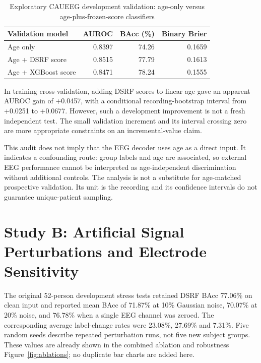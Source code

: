 \begin{table}[!htbp]\centering\small
\caption{Exploratory CAUEEG development validation: age-only versus age-plus-frozen-score classifiers}\label{tab:age-validation}
\begin{tabular}{@{}lrrr@{}}\toprule
\textbf{Validation model}&\textbf{AUROC}&\textbf{BAcc (\%)}&\textbf{Binary Brier}\\\midrule
Age only&0.8397&74.26&0.1659\\
Age + DSRF score&0.8515&77.79&0.1613\\
Age + XGBoost score&0.8471&78.24&0.1555\\\bottomrule
\end{tabular}\end{table}

In training cross-validation, adding DSRF scores to linear age gave an apparent AUROC gain of +0.0457, with a conditional recording-bootstrap interval from +0.0251 to +0.0677. However, such a development improvement is not a fresh independent test. The small validation increment and its interval crossing zero are more appropriate constraints on an incremental-value claim.


This audit does not imply that the EEG decoder uses age as a direct input. It indicates a confounding route: group labels and age are associated, so external EEG performance cannot be interpreted as age-independent discrimination without additional controls. The analysis is not a substitute for age-matched prospective validation. Its unit is the recording and its confidence intervals do not guarantee unique-patient sampling.

\section{Study B: Artificial Signal Perturbations and Electrode Sensitivity}
The original 52-person development stress tests retained DSRF BAcc 77.06\% on clean input and reported mean BAcc of 71.87\% at 10\% Gaussian noise, 70.07\% at 20\% noise, and 76.78\% when a single EEG channel was zeroed. The corresponding average label-change rates were 23.08\%, 27.69\% and 7.31\%. Five random seeds describe repeated perturbation runs, not five new subject groups. These values are already shown in the combined ablation and robustness Figure~\ref{fig:ablations}; no duplicate bar charts are added here.

